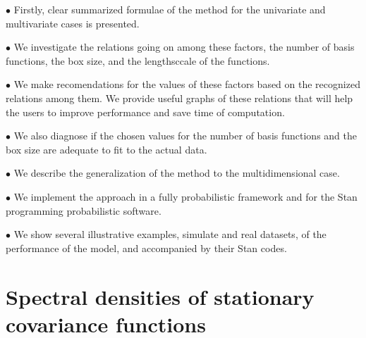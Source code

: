 \documentclass[]{interact}
\theoremstyle{plain}%
\theoremstyle{definition}
\theoremstyle{remark}
\begin{document}
\vspace{2mm}
$\bullet$ Firstly, clear summarized formulae of the method for the univariate and multivariate cases is presented. 

\vspace{2mm}
$\bullet$ We investigate the relations going on among these factors, the number of basis functions, the box size, and the lengthsccale of the functions.

\vspace{2mm}
$\bullet$ We make recomendations for the values of these factors based on the recognized relations among them. We provide useful graphs of these relations that will help the users to improve performance and save time of computation.

\vspace{2mm}
$\bullet$ We also diagnose if the chosen values for the number of basis functions and the box size are adequate to fit to the actual data.

\vspace{2mm}
$\bullet$ We describe the generalization of the method to the multidimensional case.

\vspace{2mm}
$\bullet$ We implement the approach in a fully probabilistic framework and for the Stan programming probabilistic software.

\vspace{2mm}
$\bullet$ We show several illustrative examples, simulate and real datasets, of the performance of the model, and accompanied by their Stan codes.

 

\section{Spectral densities of stationary covariance functions}
\end{document}
